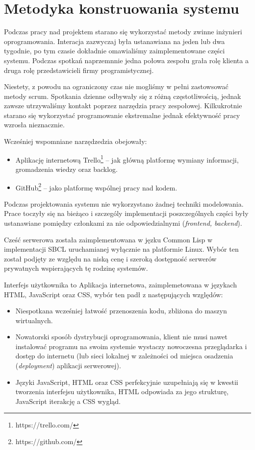 \section{Metodyka konstruowania systemu}
Podczas pracy nad projektem starano się wykorzystać metody zwinne inżynieri oprogramowania. Interacja zazwyczaj była ustanawiana na jeden lub dwa tygodnie, po tym czasie dokładnie omawialiśmy zaimplementowane części systemu. Podczas spotkań naprzemnnie jedna połowa zespołu grała rolę klienta a druga rolę przedstawicieli firmy programistycznej.

Niestety, z powodu na ograniczony czas nie mogliśmy w pełni zastowsować metody scrum. Spotkania dzienne odbywały się z różną częstotliwością, jednak zawsze utrzywaliśmy kontakt poprzez narzędzia pracy zespołowej. Kilkukrotnie starano się wykorzystać programowanie ekstremalne jednak efektywność pracy wzrosła nieznacznie.

Wcześniej wspomniane narzędzedzia obejowały:
\begin{itemize}
  \item Aplikację internetową Trello\footnote{https://trello.com/} -- jak główną platformę wymiany informacji, gromadzenia wiedzy oraz backlog.
  \item GitHub\footnote{https://github.com/} -- jako platformę wspólnej pracy nad kodem.
  \end{itemize}

Podczas projektowania systemu nie wykorzystano żadnej techniki modelowania. Prace toczyły się na bieżąco i szczególy implementacji poszczególnych części były ustanawiane pomiędzy członkami za nie odpowiedzialnymi (\emph{frontend, backend}).

Cześć serwerowa została zaimplementowana w jęzku Common Lisp w implementacji SBCL uruchamianej wyłącznie na platformie Linux. Wybór ten został podjęty ze względu na niską cenę i szeroką dostępność serwerów prywatnych wspierających tę rodzinę systemów.

Interfejs użytkownika to Aplikacja internetowa, zaimplemetowana w językach HTML, JavaScript oraz CSS, wybór ten padł z następujących względów:
\begin{itemize}
  \item Niespotkana wcześniej łatwość przenoszenia kodu, zbliżona do maszyn wirtualnych.
  \item Nowatorski sposób dystrybucji oprogramowania, klient nie musi nawet instalować programu na swoim systemie wystaczy nowoczesna przeglądarka i dostęp do internetu (lub sieci lokalnej w zależności od miejsca osadzenia (\emph{deployment}) aplikacji serwerowej).
  \item Języki JavaScript, HTML oraz CSS perfekcyjnie uzupełniają się w kwestii tworzenia interfejsu użytkownika, HTML odpowiada za jego strukturę, JavaScript iterakcję a CSS wygląd.
\end{itemize}
